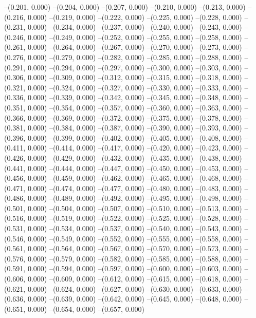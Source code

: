 {--(0.201, 0.000)
--(0.204, 0.000)
--(0.207, 0.000)
--(0.210, 0.000)
--(0.213, 0.000)
--(0.216, 0.000)
--(0.219, 0.000)
--(0.222, 0.000)
--(0.225, 0.000)
--(0.228, 0.000)
--(0.231, 0.000)
--(0.234, 0.000)
--(0.237, 0.000)
--(0.240, 0.000)
--(0.243, 0.000)
--(0.246, 0.000)
--(0.249, 0.000)
--(0.252, 0.000)
--(0.255, 0.000)
--(0.258, 0.000)
--(0.261, 0.000)
--(0.264, 0.000)
--(0.267, 0.000)
--(0.270, 0.000)
--(0.273, 0.000)
--(0.276, 0.000)
--(0.279, 0.000)
--(0.282, 0.000)
--(0.285, 0.000)
--(0.288, 0.000)
--(0.291, 0.000)
--(0.294, 0.000)
--(0.297, 0.000)
--(0.300, 0.000)
--(0.303, 0.000)
--(0.306, 0.000)
--(0.309, 0.000)
--(0.312, 0.000)
--(0.315, 0.000)
--(0.318, 0.000)
--(0.321, 0.000)
--(0.324, 0.000)
--(0.327, 0.000)
--(0.330, 0.000)
--(0.333, 0.000)
--(0.336, 0.000)
--(0.339, 0.000)
--(0.342, 0.000)
--(0.345, 0.000)
--(0.348, 0.000)
--(0.351, 0.000)
--(0.354, 0.000)
--(0.357, 0.000)
--(0.360, 0.000)
--(0.363, 0.000)
--(0.366, 0.000)
--(0.369, 0.000)
--(0.372, 0.000)
--(0.375, 0.000)
--(0.378, 0.000)
--(0.381, 0.000)
--(0.384, 0.000)
--(0.387, 0.000)
--(0.390, 0.000)
--(0.393, 0.000)
--(0.396, 0.000)
--(0.399, 0.000)
--(0.402, 0.000)
--(0.405, 0.000)
--(0.408, 0.000)
--(0.411, 0.000)
--(0.414, 0.000)
--(0.417, 0.000)
--(0.420, 0.000)
--(0.423, 0.000)
--(0.426, 0.000)
--(0.429, 0.000)
--(0.432, 0.000)
--(0.435, 0.000)
--(0.438, 0.000)
--(0.441, 0.000)
--(0.444, 0.000)
--(0.447, 0.000)
--(0.450, 0.000)
--(0.453, 0.000)
--(0.456, 0.000)
--(0.459, 0.000)
--(0.462, 0.000)
--(0.465, 0.000)
--(0.468, 0.000)
--(0.471, 0.000)
--(0.474, 0.000)
--(0.477, 0.000)
--(0.480, 0.000)
--(0.483, 0.000)
--(0.486, 0.000)
--(0.489, 0.000)
--(0.492, 0.000)
--(0.495, 0.000)
--(0.498, 0.000)
--(0.501, 0.000)
--(0.504, 0.000)
--(0.507, 0.000)
--(0.510, 0.000)
--(0.513, 0.000)
--(0.516, 0.000)
--(0.519, 0.000)
--(0.522, 0.000)
--(0.525, 0.000)
--(0.528, 0.000)
--(0.531, 0.000)
--(0.534, 0.000)
--(0.537, 0.000)
--(0.540, 0.000)
--(0.543, 0.000)
--(0.546, 0.000)
--(0.549, 0.000)
--(0.552, 0.000)
--(0.555, 0.000)
--(0.558, 0.000)
--(0.561, 0.000)
--(0.564, 0.000)
--(0.567, 0.000)
--(0.570, 0.000)
--(0.573, 0.000)
--(0.576, 0.000)
--(0.579, 0.000)
--(0.582, 0.000)
--(0.585, 0.000)
--(0.588, 0.000)
--(0.591, 0.000)
--(0.594, 0.000)
--(0.597, 0.000)
--(0.600, 0.000)
--(0.603, 0.000)
--(0.606, 0.000)
--(0.609, 0.000)
--(0.612, 0.000)
--(0.615, 0.000)
--(0.618, 0.000)
--(0.621, 0.000)
--(0.624, 0.000)
--(0.627, 0.000)
--(0.630, 0.000)
--(0.633, 0.000)
--(0.636, 0.000)
--(0.639, 0.000)
--(0.642, 0.000)
--(0.645, 0.000)
--(0.648, 0.000)
--(0.651, 0.000)
--(0.654, 0.000)
--(0.657, 0.000)
}
